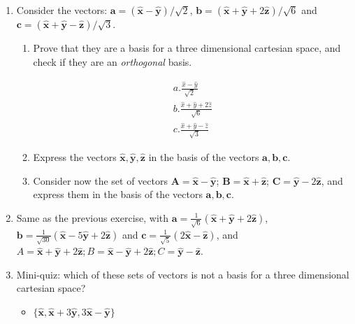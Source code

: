 \documentclass{article}
\begin{document}
\begin{enumerate}


\item Consider the vectors: $\mathbf{a}=( \mathbf{\hat{x}} - \mathbf{\hat{y}} ) / \sqrt{2} $, $\mathbf{b}=( \mathbf{\hat{x}} + \mathbf{\hat{y}} + 2 \mathbf{\hat{z}} ) / \sqrt{6}$ and $\mathbf{c}=(\mathbf{\hat{x}}+\mathbf{\hat{y}}-\mathbf{\hat{z}})/\sqrt{3}$. 
\begin{enumerate}
\item Prove that they are a basis for a three dimensional cartesian space, and check if they are an \emph{orthogonal} basis. 

\[
\begin{array}{lll}
a.\frac{\hat{x}-\hat{y}}{\sqrt{2}} \\
b.\frac{\hat{x}+\hat{y}+2\hat{z}}{\sqrt{6}} \\
c.\frac{\hat{x}+\hat{y}-\hat{z}}{\sqrt{3}}
\end{array}
\]








\item Express the vectors $\mathbf{\hat{x}}, \mathbf{\hat{y}}, \mathbf{\hat{z}}$ in the basis of the vectors $\mathbf{a}, \mathbf{b}, \mathbf{c}$. 

\item Consider now the set of vectors $\mathbf{A}=\mathbf{\hat{x}}-\mathbf{\hat{y}}$; $\mathbf{B}=\mathbf{\hat{x}}+\mathbf{\hat{z}}$; $\mathbf{C}=\mathbf{\hat{y}}-2\mathbf{\hat{z}}$, and express them in the basis of the vectors $\mathbf{a}, \mathbf{b}, \mathbf{c}$. 

\end{enumerate}


\item Same as the previous exercise, with $\mathbf{a}=\frac{1}{\sqrt{6}} ( \mathbf{\hat{x}} + \mathbf{\hat{y}} + 2 \mathbf{\hat{z}} ) $, $\mathbf{b}=\frac{1}{\sqrt{30}} (\mathbf{\hat{x}} - 5\mathbf{\hat{y}} + 2\mathbf{\hat{z}})$ and $\mathbf{c}= \frac{1}{\sqrt{5}} ( 2 \mathbf{\hat{x} }- \mathbf{\hat{z} })$, and 
$A=\mathbf{\hat{x}}+\mathbf{\hat{y}}+2\mathbf{\hat{z}}; B=\mathbf{\hat{x}}-\mathbf{\hat{y}}+2\mathbf{\hat{z}}; C=\mathbf{\hat{y}}-\mathbf{\hat{z}}$. 


\item Mini-quiz: which of these sets of vectors is not a basis for a three dimensional cartesian space? 
\begin{itemize}
\item $\{ \mathbf{\hat{x}}, \mathbf{\hat{x}}+3\mathbf{\hat{y}}, 3\mathbf{\hat{x}}-\mathbf{\hat{y}} \}$


\end{itemize}
\end{enumerate}
\end{document}
